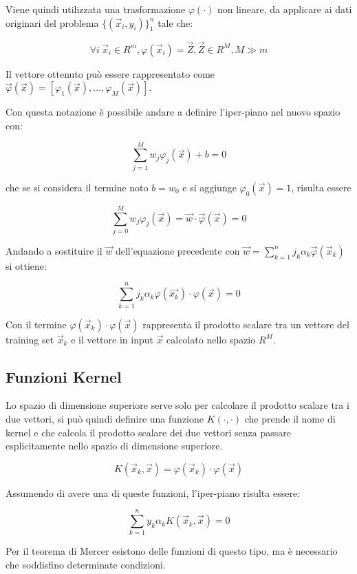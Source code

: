 Viene quindi utilizzata una trasformazione $\varphi(\cdot)$ non lineare, da applicare ai dati originari del problema $\{(\vec{x}_i, y_i)\}_1^n$ tale che:

$$ \forall i \: \vec{x}_i \in R^m, \varphi(\vec{x}_i) = \vec{Z}, \vec{Z} \in R^M, M \gg m $$

Il vettore ottenuto può essere rappresentato come $\vec{\varphi}(\vec{x}) = [ \varphi_1(\vec{x}), \ldots , \varphi_M(\vec{x}) ] $.

Con questa notazione è possibile andare a definire l'iper-piano nel nuovo spazio con:

$$ \sum\limits_{j=1}^M w_j \varphi_j(\vec{x}) + b = 0$$

che se si considera il termine noto $b = w_0$ e si aggiunge $\varphi_0(\vec{x}) = 1$, risulta essere

$$ \sum\limits_{j=0}^M w_j \varphi_j(\vec{x}) = \vec{w} \cdot \vec{\varphi}(\vec{x}) = 0$$

Andando a sostituire il $\vec{w}$ dell'equazione precedente con $ \vec{w} = \sum\limits_{k=1}^n j_k \alpha_k \vec{\varphi}(\vec{x}_k)$ si ottiene:

$$ \sum\limits_{k=1}^n j_k \alpha_k \varphi(\vec{x_k}) \cdot \varphi(\vec{x}) = 0 $$

Con il termine $\varphi(\vec{x}_k) \cdot \varphi(\vec{x})$ rappresenta il prodotto scalare tra un vettore del training set $\vec{x}_k$ e il vettore in input $\vec{x}$ calcolato nello spazio $R^M$.

\subsection{Funzioni Kernel}\label{funzioni-kernel}

Lo spazio di dimensione superiore serve solo per calcolare il prodotto scalare tra i due vettori, si può quindi definire una funzione $K(\cdot, \cdot)$ che prende il nome di kernel e che calcola il prodotto scalare dei due vettori senza passare esplicitamente nello spazio di dimensione superiore.

$$ K(\vec{x}_k, \vec{x}) = \varphi(\vec{x}_k) \cdot \varphi(\vec{x})$$

Assumendo di avere una di queste funzioni, l'iper-piano risulta essere:

$$\sum\limits_{k=1}^n  y_k \alpha_k K(\vec{x}_k, \vec{x}) = 0$$

Per il teorema di Mercer esistono delle funzioni di questo tipo, ma è necessario che soddisfino determinate condizioni.

